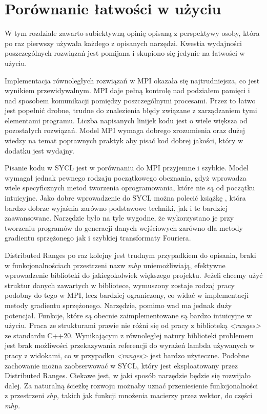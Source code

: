 \documentclass[a4paper,12pt]{book} %
\begin{document}
\chapter{Porównanie łatwości w użyciu}
W tym rozdziale zawarto subiektywną opinię opisaną z perspektywy osoby, która po raz pierwszy używała każdego z opisanych narzędzi. Kwestia wydajności poszczególnych rozwiązań jest pomijana i skupiono się jedynie na łatwości w użyciu.

Implementacja równoległych rozwiązań w MPI okazała się najtrudniejsza, co jest wynikiem przewidywalnym. MPI daje pełną kontrolę nad podziałem pamięci i nad sposobem komunikacji pomiędzy poszczególnymi procesami. Przez to łatwo jest popełnić drobne, trudne do znalezienia błędy związane z zarządzaniem tymi elementami programu. Liczba napisanych linijek kodu jest o wiele większa od pozostałych rozwiązań. Model MPI wymaga dobrego zrozumienia oraz dużej wiedzy na temat poprawnych praktyk aby pisać kod dobrej jakości, który w dodatku jest wydajny.

Pisanie kodu w SYCL jest w porównaniu do MPI przyjemne i szybkie. Model wymagał jednak pewnego rodzaju początkowego obeznania, gdyż wprowadza wiele specyficznych metod tworzenia oprogramowania, które nie są od początku intuicyjne. Jako dobre wprowadzenie do SYCL można polecić książkę \cite{sycl-book}, która bardzo dobrze wyjaśnia zarówno podstawowe techniki, jak i te bardziej zaawansowane. Narzędzie było na tyle wygodne, że wykorzystano je przy tworzeniu programów do generacji danych wejściowych zarówno dla metody gradientu sprzężonego jak i szybkiej transformaty Fouriera.

Distributed Ranges po raz kolejny jest trudnym przypadkiem do opisania, braki w funkcjonalnościach przestrzeni nazw \emph{mhp} uniemożliwiają, efektywne wprowadzenie biblioteki do jakiegokolwiek większego projektu. Jeżeli chcemy użyć struktur danych zawartych w bibliotece, wymuszony zostaje rodzaj pracy podobny do tego w MPI, lecz bardziej ograniczony, co widać w implementacji metody gradientu sprzężonego. Narzędzie, pomimo wad ma jednak duży potencjał. Funkcje, które są obecnie zaimplementowane są bardzo intuicyjne w użyciu. Praca ze strukturami prawie nie różni się od pracy z biblioteką \emph{<ranges>} ze standardu C++20. Wynikającym z równoległej natury biblioteki problemem jest brak możliwości przekazywania referencji do wyrażeń lambda używanych w pracy z widokami, co w przypadku \emph{<ranges>} jest bardzo użyteczne. Podobne zachowanie można zaobserwować w SYCL, który jest eksploatowany przez Distributed Ranges. Ciekawe jest, w jaki sposób narzędzie będzie się rozwijało dalej. Za naturalną ścieżkę rozwoju możnaby uznać przeniesienie funkcjonalności z przestrzeni \emph{shp,} takich jak funkcji mnożenia macierzy przez wektor, do części \emph{mhp.}
\end{document}
